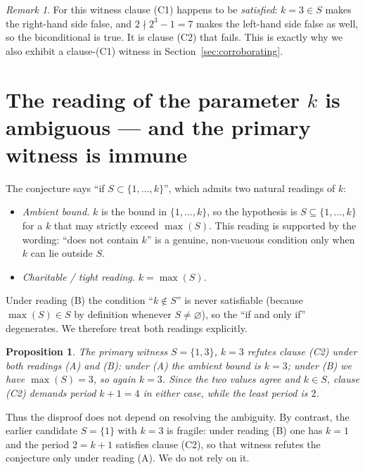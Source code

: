 \documentclass[11pt]{article}
\newtheorem{proposition}[theorem]{Proposition}
\theoremstyle{definition}
\theoremstyle{remark}
\newtheorem{remark}[theorem]{Remark}
\begin{document}
\begin{remark}
For this witness clause (C1) happens to be \emph{satisfied}: $k = 3 \in S$ makes
the right-hand side false, and $2 \nmid 2^3 - 1 = 7$ makes the left-hand side
false as well, so the biconditional is true. It is clause (C2) that fails. This
is exactly why we also exhibit a clause-(C1) witness in
Section~\ref{sec:corroborating}.
\end{remark}

\section{The reading of the parameter $k$ is ambiguous --- and the primary
witness is immune}

The conjecture says ``if $S \subset \{1,\dots,k\}$'', which admits two natural
readings of $k$:

\begin{itemize}
\item[(A)] \emph{Ambient bound.} $k$ is the bound in $\{1,\dots,k\}$, so the
  hypothesis is $S \subseteq \{1,\dots,k\}$ for a $k$ that may strictly exceed
  $\max(S)$. This reading is supported by the wording: ``does not contain $k$''
  is a genuine, non-vacuous condition only when $k$ can lie outside $S$.
\item[(B)] \emph{Charitable / tight reading.} $k = \max(S)$.
\end{itemize}

Under reading (B) the condition ``$k \notin S$'' is never satisfiable (because
$\max(S) \in S$ by definition whenever $S \neq \varnothing$), so the ``if and
only if'' degenerates. We therefore treat both readings explicitly.

\begin{proposition}\label{prop:immune}
The primary witness $S = \{1,3\}$, $k=3$ refutes clause (C2) under
\emph{both} readings (A) and (B): under (A) the ambient bound is $k = 3$; under
(B) we have $\max(S) = 3$, so again $k = 3$. Since the two values agree and
$k \in S$, clause (C2) demands period $k+1 = 4$ in either case, while the least
period is $2$.
\end{proposition}

Thus the disproof does not depend on resolving the ambiguity. By contrast, the
earlier candidate $S = \{1\}$ with $k = 3$ is fragile: under reading (B) one has
$k = 1$ and the period $2 = k+1$ satisfies clause (C2), so that witness refutes
the conjecture only under reading (A). We do not rely on it.
\end{document}
